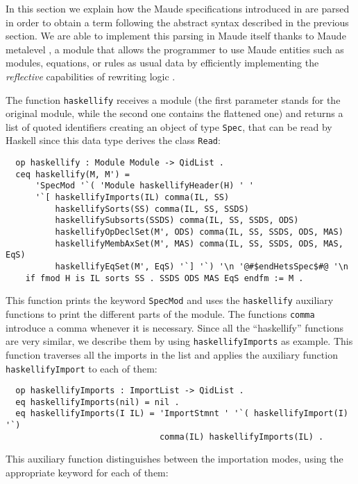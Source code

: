 
In this section we explain how the Maude specifications introduced in
\Hets are parsed in order to obtain a term following the abstract syntax
described in
the previous section. We are able to implement this parsing in Maude
itself thanks to Maude metalevel \cite[Chapter 14]{maude-book}, a
module that allows the programmer to use Maude entities such as modules, equations,
or rules as usual data by efficiently implementing the \emph{reflective}
capabilities of rewriting logic \cite{ClavelMeseguerPalomino07}.

The function \verb"haskellify" receives a module (the first parameter
stands for the original module, while the second one contains the
flattened one) and returns a list of quoted identifiers creating an
object of type \verb"Spec", that can be read by Haskell since this data
type derives the class \verb"Read":

{\codesize
\begin{verbatim}
  op haskellify : Module Module -> QidList .
  ceq haskellify(M, M') = 
      'SpecMod '`( 'Module haskellifyHeader(H) ' ' 
      '`[ haskellifyImports(IL) comma(IL, SS)
          haskellifySorts(SS) comma(IL, SS, SSDS)
          haskellifySubsorts(SSDS) comma(IL, SS, SSDS, ODS)
          haskellifyOpDeclSet(M', ODS) comma(IL, SS, SSDS, ODS, MAS)
          haskellifyMembAxSet(M', MAS) comma(IL, SS, SSDS, ODS, MAS, EqS)
          haskellifyEqSet(M', EqS) '`] '`) '\n '@#$endHetsSpec$#@ '\n
    if fmod H is IL sorts SS . SSDS ODS MAS EqS endfm := M .
\end{verbatim}
}

This function prints the keyword \verb"SpecMod" and uses the \verb"haskellify"
auxiliary functions to print the different parts of the module.
The functions \verb"comma" introduce a comma whenever it is necessary.
Since all the ``haskellify'' functions are very similar, we describe
them by using \verb"haskellifyImports" as example. This function traverses
all the imports in the list and applies the auxiliary function
\verb"haskellifyImport" to each of them:

{\codesize
\begin{verbatim}
  op haskellifyImports : ImportList -> QidList .
  eq haskellifyImports(nil) = nil .
  eq haskellifyImports(I IL) = 'ImportStmnt ' '`( haskellifyImport(I) '`)
                               comma(IL) haskellifyImports(IL) .
\end{verbatim}
}

This auxiliary function distinguishes between the importation modes,
using the appropriate keyword for each of them:

